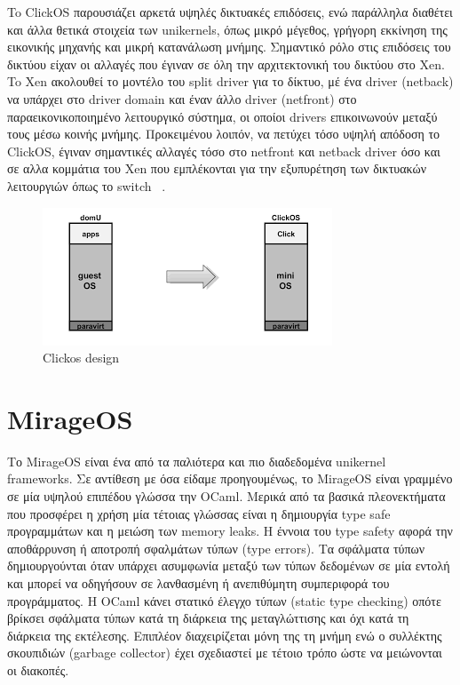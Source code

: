 To ClickOS παρουσιάζει αρκετά υψηλές δικτυακές επιδόσεις, ενώ παράλληλα διαθέτει
και άλλα θετικά στοιχεία των unikernels, όπως μικρό μέγεθος, γρήγορη εκκίνηση
της εικονικής μηχανής και μικρή κατανάλωση μνήμης. Σημαντικό ρόλο στις επιδόσεις
του δικτύου είχαν οι αλλαγές που έγιναν σε όλη την αρχιτεκτονική του δικτύου στο
Xen. To Χen ακολουθεί το μοντέλο του split driver για το δίκτυο, μέ ένα driver
(netback) να υπάρχει στο driver domain και έναν άλλο driver (netfront) στο
παραεικονικοποιημένο λειτουργικό σύστημα, οι οποίοι drivers επικοινωνούν μεταξύ
τους μέσω κοινής μνήμης. Προκειμένου λοιπόν, να πετύχει τόσο
υψηλή απόδοση το ClickOS, έγιναν σημαντικές αλλαγές τόσο στο netfront και netback
driver όσο και σε αλλα κομμάτια του Xen που εμπλέκονται για την εξυπυρέτηση των
δικτυακών λειτουργιών όπως το switch ~\cite{martins2014clickos}.  

\begin{figure}[htp]
\centering
\includegraphics[scale=0.6]{figures/clickos.png}
\caption{Clickos design\label{fig3_6}}
\end{figure}

\section{MirageOS}

Το MirageOS είναι ένα από τα παλιότερα και πιο διαδεδομένα unikernel frameworks.
Σε αντίθεση με όσα είδαμε προηγουμένως, το MirageOS είναι γραμμένο σε
μία υψηλού επιπέδου γλώσσα την OCaml. Μερικά από τα βασικά πλεονεκτήματα που
προσφέρει η χρήση μία τέτοιας γλώσσας είναι η δημιουργία type safe προγραμμάτων
και η μειώση των memory leaks. Η έννοια του type safety αφορά
την αποθάρρυνση ή αποτροπή σφαλμάτων τύπων (type errors). Τα σφάλματα τύπων
δημιουργούνται όταν υπάρχει ασυμφωνία μεταξύ των τύπων δεδομένων σε μία εντολή
και μπορεί να οδηγήσουν σε λανθασμένη ή ανεπιθύμητη συμπεριφορά του
προγράμματος. Η OCaml κάνει στατικό έλεγχο τύπων (static type checking) οπότε
βρίκσει σφάλματα τύπων κατά τη διάρκεια της μεταγλώττισης και όχι κατά τη
διάρκεια της εκτέλεσης. Επιπλέον διαχειρίζεται μόνη της τη μνήμη ενώ ο συλλέκτης
σκουπιδιών (garbage collector) έχει σχεδιαστεί με τέτοιο τρόπο ώστε να
μειώνονται οι διακοπές.

